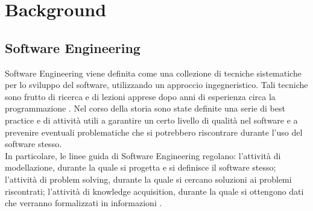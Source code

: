 \chapter{Background} %
%

\section{Software Engineering}
Software Engineering viene definita come una collezione di tecniche sistematiche per lo sviluppo del software, utilizzando un approccio ingegneristico. Tali tecniche sono frutto di ricerca e di lezioni apprese dopo anni di esperienza circa la programmazione \cite{mall2014fundamentals}. Nel corso della storia sono state definite una serie di best practice e di attività utili a garantire un certo livello di qualità nel software e a prevenire eventuali problematiche che si potrebbero riscontrare durante l'uso del software stesso.\\In particolare, le linee guida di Software Engineering regolano: l'attività di modellazione, durante la quale si progetta e si definisce il software stesso; l'attività di problem solving, durante la quale si cercano soluzioni ai problemi riscontrati; l'attività di knowledge acquisition, durante la quale si ottengono dati che verranno formalizzati in informazioni \cite{bruegge2009object}.\\
